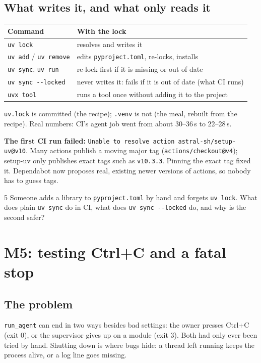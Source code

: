 \documentclass[11pt,a4paper]{article}
\begin{document}
\subsection{What writes it, and what only reads it}
\begin{center}
\begin{tabularx}{\textwidth}{l X}
\toprule
\textbf{Command} & \textbf{With the lock} \\
\midrule
\texttt{uv lock} & resolves and writes it \\
\texttt{uv add} / \texttt{uv remove} & edits \texttt{pyproject.toml}, re-locks, installs \\
\texttt{uv sync}, \texttt{uv run} & re-lock first if it is missing or out of date \\
\texttt{uv sync -{}-locked} & never writes it: fails if it is out of date (what CI runs) \\
\texttt{uvx tool} & runs a tool once without adding it to the project \\
\bottomrule
\end{tabularx}
\end{center}
\noindent \texttt{uv.lock} is committed (the recipe); \texttt{.venv} is not (the meal, rebuilt
from the recipe). Real numbers: CI's agent job went from about 30--36\,s to 22--28\,s.

\begin{caution}
\textbf{The first CI run failed:} \texttt{Unable to resolve action astral-sh/setup-uv@v10}.
Many actions publish a moving major tag (\texttt{actions/checkout@v4}); setup-uv only publishes
exact tags such as \texttt{v10.3.3}. Pinning the exact tag fixed it. Dependabot now proposes
real, existing newer versions of actions, so nobody has to guess tags.
\end{caution}

\begin{quickcheck}{5}
Someone adds a library to \texttt{pyproject.toml} by hand and forgets \texttt{uv lock}. What does
plain \texttt{uv sync} do in CI, what does \texttt{uv sync -{}-locked} do, and why is the second
safer?
\end{quickcheck}

\section{M5: testing Ctrl+C and a fatal stop}
\subsection{The problem}
\texttt{run\_agent} can end in two ways besides bad settings: the owner presses Ctrl+C (exit 0),
or the supervisor gives up on a module (exit 3). Both had only ever been tried by hand. Shutting
down is where bugs hide: a thread left running keeps the process alive, or a log line goes missing.
\end{document}
